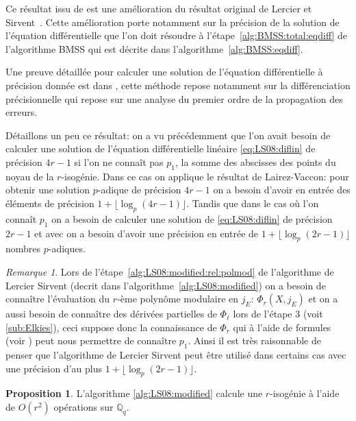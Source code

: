 \documentclass[10pt,a4paper]{book}
\theoremstyle{plain}
\theoremstyle{definition}
\theoremstyle{definition}
\theoremstyle{definition}
\theoremstyle{definition}
\newtheorem{prop}[thm]{Proposition}
\theoremstyle{definition}
\theoremstyle{remark}
\newtheorem{rem}[thm]{Remarque}
\theoremstyle{remark}
\theoremstyle{definition}
\begin{document}
Ce résultat issu de \cite[Theorem 2]{LairezVaccon16} est une amélioration du résultat original de Lercier et Sirvent~\cite{Lercier-Sirvent2008}. Cette amélioration porte notamment sur la précision de la solution de l'équation différentielle que l'on doit résoudre à l'étape~\ref{alg:BMSS:total:eqdiff} de l'algorithme BMSS  qui est décrite dans l'algorithme~\ref{alg:BMSS:eqdiff}.


Une preuve détaillée pour calculer une solution de l'équation différentielle à précision donnée est dans \cite{LairezVaccon16}, cette méthode repose notamment sur la différenciation précisionnelle qui repose sur une analyse du premier ordre de la propagation des erreurs. 

Détaillons un peu ce résultat: on a vu précédemment que l'on avait besoin de 
calculer une solution de l'équation différentielle linéaire 
\eqref{eq:LS08:diflin} de précision $4r-1$ si l'on ne connaît pas $p_1$, la 
somme des abscisses des points du noyau de la $r$-isogénie. Dans ce cas on 
applique le résultat de Lairez-Vaccon: pour obtenir une solution $p$-adique de 
précision $4 r-1$ on a besoin d'avoir en entrée des éléments de précision $ 1 +
\lfloor \log_p(4 r - 1) \rfloor $. Tandis que dans le cas où l'on connaît $p_1$
on a besoin de calculer une solution de \eqref{eq:LS08:diflin} de précision 
$2r - 1$ et avec \cite[Theorem 2]{LairezVaccon16} on a besoin d'avoir une 
précision en entrée de $ 1 + \lfloor \log_p(2 r - 1) \rfloor $ nombres 
$p$-adiques.

\begin{rem}
Lors de l'étape~\ref{alg:LS08:modified:rel:polmod} de l'algorithme de Lercier Sirvent (decrit dans l'algorithme~\ref{alg:LS08:modified}) on a besoin de connaître l'évaluation du $r$-ème polynôme modulaire en $j_E$: $\Phi_{r}(X,j_E)$ et on a aussi besoin de connaître des dérivées partielles de $\Phi_{\ell}$ lors de l'étape $3$ (voit \ref{sub:Elkies}), ceci suppose donc la connaissance de $\Phi_{r}$ qui à l'aide de formules (voir \cite[Theorem 17.22]{ehcc05}) peut nous permettre de connaître $p_1$. Ainsi il est très raisonnable de penser que l'algorithme de Lercier Sirvent peut être utilisé dans certains cas avec une précision d'au plus $1 + \lfloor \log_{p}(2r - 1) \rfloor$.
\end{rem}

\begin{prop}
L'algorithme \ref{alg:LS08:modified} calcule une $r$-isogénie à l'aide de $O(r^2)$  opérations sur $\mathbb{Q}_q$.
\end{prop}
\end{document}

